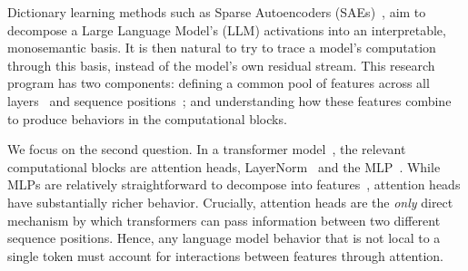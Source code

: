 \documentclass{article}
\theoremstyle{plain}
\theoremstyle{definition}
\theoremstyle{remark}
\begin{document}
Dictionary learning methods such as Sparse Autoencoders (SAEs)~\citep{cunningham2023sparse, bricken2023monosemanticity, templeton2024scaling}, aim to decompose a Large Language Model's (LLM) activations into an interpretable, monosemantic basis. It is then natural to try to trace a model's computation~\citep{marks2024sparse,kamath2025tracing} through this basis, instead of the model's own residual stream. This research program has two components: defining a common pool of features across all layers~\citep{brickencrosscoders} and sequence positions~\citep{bhallatsae_2025,tfa_2025}; and understanding how these features combine to produce behaviors in the computational blocks.

We focus on the second question. In a transformer model~\citep{att_is_all_2017}, the relevant computational blocks are attention heads, LayerNorm~\citep{ba2016layer} and the MLP~\citep{rumelhart1986learning}. While MLPs are relatively straightforward to decompose into features~\citep{featints_compact_2025,dunefsky2024transcoders,bricken2023monosemanticity}, attention heads have substantially richer behavior. Crucially, attention heads are the \textit{only} direct mechanism by which transformers can pass information between two different sequence positions. Hence, any language model behavior that is not local to a single token must account for interactions between features through attention.
\end{document}
